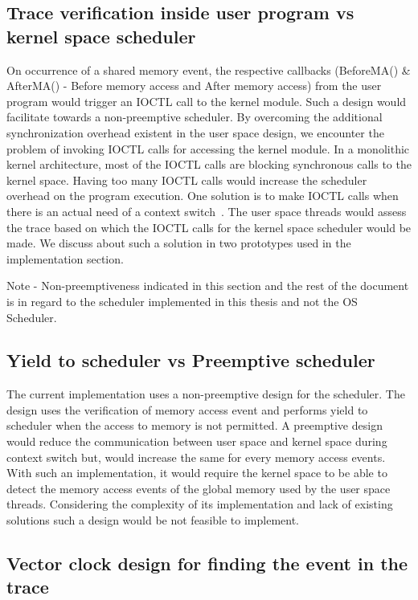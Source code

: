 \subsection{Trace verification inside user program vs kernel space scheduler}

On occurrence of a shared memory event, the respective callbacks (BeforeMA() \& AfterMA() - Before memory access and After memory access) from the user program would trigger an IOCTL call to the kernel module. 
Such a design would facilitate towards a non-preemptive scheduler. 
By overcoming the additional synchronization overhead existent in the user space design, we encounter the problem of invoking IOCTL calls  for accessing the kernel module. 
In a monolithic kernel architecture, most of the IOCTL calls are blocking synchronous calls to the kernel space. 
Having too many IOCTL calls would increase the scheduler overhead on the program execution. 
One solution is to make IOCTL calls when there is an actual need of a  context switch~\citep{flexsc}. 
The user space threads would assess the trace based on which the IOCTL calls for the kernel space scheduler would be made. 
We discuss about such a solution in two prototypes used in the implementation section.

Note - Non-preemptiveness indicated in this section and the rest of the document is in regard to the scheduler implemented in this thesis and not the OS Scheduler.

\subsection{Yield to scheduler vs Preemptive scheduler}

The current implementation uses a non-preemptive design for the scheduler. 
The design uses the verification of memory access event and performs yield to scheduler when the access to memory is not permitted. 
A preemptive design would reduce the communication between user space and kernel space during context switch but, would increase the same for every memory access events. 
With such an implementation, it would require the kernel space to be able to detect the memory access events of the global memory used by the user space threads. 
Considering the complexity of its implementation and lack of existing solutions such a design would be not feasible to implement. 


\subsection{Vector clock design for finding the event in the trace}

